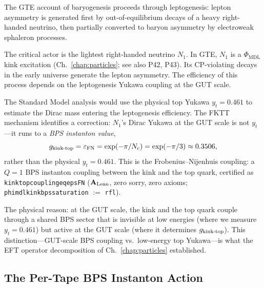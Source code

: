 \documentclass[11pt,openany]{book}
\theoremstyle{remark}
\newcommand{\PHIMDL}{\Phi_{\mathrm{MDL}}}
\newcommand{\lean}[1]{%
  \penalty-100
  \begingroup\def\_{\textunderscore\allowbreak}\texttt{#1}\endgroup}
\newcommand{\Nc}{N_c}
\newcommand{\CatAL}{\ensuremath{\textbf{A}_{\rm Lean}}}
\begin{document}
The GTE account of baryogenesis proceeds through leptogenesis:
lepton asymmetry is generated first by out-of-equilibrium decays of a heavy right-handed
neutrino, then partially converted to baryon asymmetry by electroweak sphaleron processes.

The critical actor is the lightest right-handed neutrino $N_1$.
In GTE, $N_1$ is a $\PHIMDL$ kink excitation (Ch.~\ref{chap:particles};
see also P42, P43).
Its CP-violating decays in the early universe generate the lepton asymmetry.
The efficiency of this process depends on the leptogenesis Yukawa coupling at the
GUT scale.

The Standard Model analysis would use the physical top Yukawa $y_t = 0.461$
to estimate the Dirac mass entering the leptogenesis efficiency.
The FKTT mechanism identifies a correction: $N_1$'s Dirac Yukawa at the GUT scale
is not $y_t$---it runs to a \emph{BPS instanton value},
\begin{equation}
  g_{\rm kink\text{-}top}
  = \varepsilon_{\rm FN}
  = \exp(-\pi/\Nc)
  = \exp(-\pi/3)
  \approx 0.3506,
\label{eq:eps_fn}
\end{equation}
rather than the physical $y_t = 0.461$.
This is the Frobenius--Nijenhuis coupling: a $Q = 1$ BPS instanton coupling between
the kink and the top quark, certified as
\lean{kink\_top\_coupling\_eq\_eps\_FN} (\CatAL, zero sorry, zero axioms;
\lean{phi\_mdl\_kink\_bps\_saturation} $\mathrel{:=}$ \texttt{rfl}).

The physical reason: at the GUT scale, the kink and the top quark couple through
a shared BPS sector that is invisible at low energies (where we measure $y_t = 0.461$)
but active at the GUT scale (where it determines $g_{\rm kink\text{-}top}$).
This distinction---GUT-scale BPS coupling vs.\ low-energy top Yukawa---is what the
EFT operator decomposition of Ch.~\ref{chap:particles} established.

\subsection*{The Per-Tape BPS Instanton Action}
\end{document}
